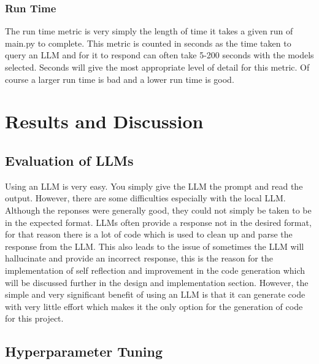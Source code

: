 \documentclass[12pt]{extarticle}
\begin{document}
\subsubsection{Run Time}

The run time metric is very simply the length of time it takes a given run of main.py to complete. This metric is counted in seconds as the time taken to query an LLM and for it to respond can often take 5-200 seconds with the models selected. Seconds will give the most appropriate level of detail for this metric. Of course a larger run time is bad and a lower run time is good.
\newpage
\section{Results and Discussion}


\subsection{Evaluation of LLMs}

Using an LLM is very easy. You simply give the LLM the prompt and read the output. However, there are some difficulties especially with the local LLM. Although the reponses were generally good, they could not simply be taken to be in the expected format. LLMs often provide a response not in the desired format, for that reason there is a lot of code which is used to clean up and parse the response from the LLM. This also leads to the issue of sometimes the LLM will hallucinate and provide an incorrect response, this is the reason for the implementation of self reflection and improvement in the code generation which will be discussed further in the design and implementation section. However, the simple and very significant benefit of using an LLM is that it can generate code with very little effort which makes it the only option for the generation of code for this project.

\subsection{Hyperparameter Tuning}
\end{document}
